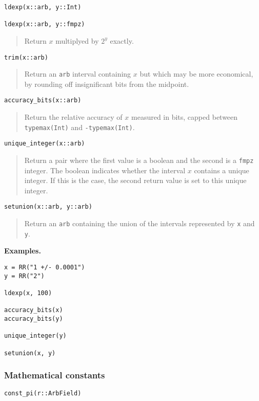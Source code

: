 \documentclass[a4paper,10pt]{article}
\newcommand{\code}{\lstinline}
\newcommand{\desc}[1]{\vspace{-3mm}\begin{quote}#1\end{quote}}
\begin{document}
{{\begin{lstlisting}
ldexp(x::arb, y::Int)

ldexp(x::arb, y::fmpz)
\end{lstlisting}

\desc{Return $x$ multiplyed by $2^y$ exactly.}

\begin{lstlisting}
trim(x::arb)
\end{lstlisting}

\desc{Return an \code{arb} interval containing $x$ but which may be more economical,
by rounding off insignificant bits from the midpoint.}

\begin{lstlisting}
accuracy_bits(x::arb)
\end{lstlisting}

\desc{Return the relative accuracy of $x$ measured in bits, capped
between \code{typemax(Int)} and \code{-typemax(Int)}.}

\begin{lstlisting}
unique_integer(x::arb)
\end{lstlisting}

\desc{Return a pair where the first value is a boolean and the second
is a \code{fmpz} integer. The boolean indicates whether the interval $x$
contains a unique integer. If this is the case, the second return
value is set to this unique integer.}

\begin{lstlisting}
setunion(x::arb, y::arb)
\end{lstlisting}

\desc{Return an \code{arb} containing the union of the intervals
represented by \code{x} and \code{y}.}

\textbf{Examples.}

\begin{lstlisting}
x = RR("1 +/- 0.0001")
y = RR("2")

ldexp(x, 100)

accuracy_bits(x)
accuracy_bits(y)

unique_integer(y)

setunion(x, y)
\end{lstlisting}

\subsubsection{Mathematical constants}

\begin{lstlisting}
const_pi(r::ArbField)
\end{lstlisting}

}}
\end{document}
